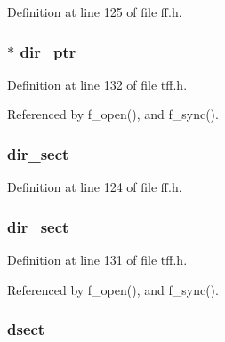 Definition at line 125 of file ff.\-h.

\hypertarget{struct_f_i_l_abc0a41dfbb69ffc78a01f5a357412995}{
\subsubsection[{dir\-\_\-ptr}]{$\ast$ dir\-\_\-ptr}}\label{struct_f_i_l_abc0a41dfbb69ffc78a01f5a357412995}


Definition at line 132 of file tff.\-h.



Referenced by f\-\_\-open(), and f\-\_\-sync().

\hypertarget{struct_f_i_l_a5e11faf537370889c867127205f26ad1}{
\subsubsection[{dir\-\_\-sect}]{ dir\-\_\-sect}}\label{struct_f_i_l_a5e11faf537370889c867127205f26ad1}


Definition at line 124 of file ff.\-h.

\hypertarget{struct_f_i_l_ac40d4a51f8f940e6154d364c45935278}{
\subsubsection[{dir\-\_\-sect}]{ dir\-\_\-sect}}\label{struct_f_i_l_ac40d4a51f8f940e6154d364c45935278}


Definition at line 131 of file tff.\-h.



Referenced by f\-\_\-open(), and f\-\_\-sync().

\hypertarget{struct_f_i_l_a272171f74215002aba31a89428f1d290}{
\subsubsection[{dsect}]{ dsect}}\label{struct_f_i_l_a272171f74215002aba31a89428f1d290}


